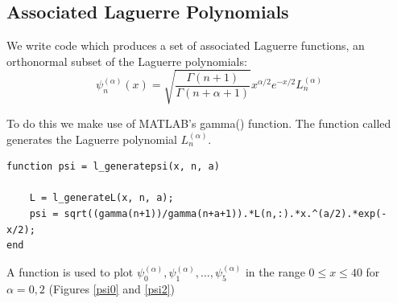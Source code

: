 \documentclass{article}
\begin{document}
\subsection{Associated Laguerre Polynomials}

We write code which produces a set of associated Laguerre functions, an orthonormal subset of the Laguerre polynomials:
$$
\psi_n^{(\alpha)} (x) = \sqrt{\dfrac{\Gamma(n+1)}{\Gamma(n+\alpha+1)}} x^{\alpha/2} e^{-x/2} L_n^{(\alpha)}
$$

To do this we make use of MATLAB's gamma() function. The function  called generates the Laguerre polynomial $ L_n^{(\alpha)} $.

\begin{lstlisting}
function psi = l_generatepsi(x, n, a)

    L = l_generateL(x, n, a);
    psi = sqrt((gamma(n+1))/gamma(n+a+1)).*L(n,:).*x.^(a/2).*exp(-x/2);
end
\end{lstlisting}

A function  is used to plot $\psi_0^{(\alpha)}, \psi_1^{(\alpha)}, ...,  \psi_5^{(\alpha)} $ in the range $ 0 \le x \le 40 $ for $ \alpha = 0,2 $ (Figures \ref{psi0} and \ref{psi2})
\end{document}
